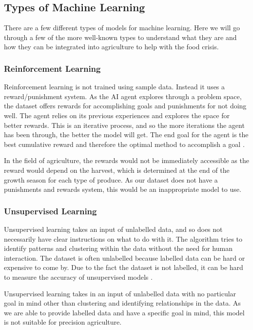 \subsection{Types of Machine Learning}

There are a few different types of models for machine learning. Here we will go through a few of the more well-known types to understand what they are and how they can be integrated into agriculture to help with the food crisis.

\subsubsection{Reinforcement Learning}

Reinforcement learning is not trained using sample data. Instead it uses a reward/punishment system. As the AI agent explores through a problem space, the dataset offers rewards for accomplishing goals and punishments for not doing well. The agent relies on its previous experiences and explores the space for better rewards. This is an iterative process, and so the more iterations the agent has been through, the better the model will get. The end goal for the agent is the best cumulative reward and therefore the optimal method to accomplish a goal \cite{machineLearningIBM} \cite{machineLearningNvidia}.

In the field of agriculture, the rewards would not be immediately accessible as the reward would depend on the harvest, which is determined at the end of the growth season for each type of produce. As our dataset does not have a punishments and rewards system, this would be an inappropriate model to use.

\subsubsection{Unsupervised Learning}

Unsupervised learning takes an input of unlabelled data, and so does not necessarily have clear instructions on what to do with it. The algorithm tries to identify patterns and clustering within the data without the need for human interaction. The dataset is often unlabelled because labelled data can be hard or expensive to come by. Due to the fact the dataset is not labelled, it can be hard to measure the accuracy of unsupervised models \cite{machineLearningIBM} \cite{machineLearningNvidia}.

Unsupervised learning takes in an input of unlabelled data with no particular goal in mind other than clustering and identifying relationships in the data. As we are able to provide labelled data and have a specific goal in mind, this model is not suitable for precision agriculture.


